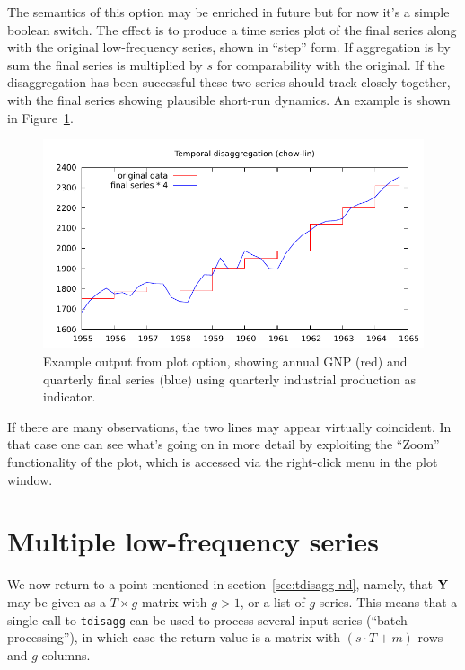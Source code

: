 The semantics of this option may be enriched in future but for now
it's a simple boolean switch. The effect is to produce a time series
plot of the final series along with the original low-frequency series,
shown in ``step'' form. If aggregation is by sum the final series is
multiplied by $s$ for comparability with the original. If the
disaggregation has been successful these two series should track
closely together, with the final series showing plausible short-run
dynamics. An example is shown in Figure~\ref{fig:gnpa}.

\begin{figure}
  \centering
  \includegraphics{figures/gnpa}
  \caption{Example output from plot option, showing annual GNP (red)
    and quarterly final series (blue) using quarterly industrial
    production as indicator.}
  \label{fig:gnpa}
\end{figure}

If there are many observations, the two lines may appear virtually
coincident. In that case one can see what's going on in more detail by
exploiting the ``Zoom'' functionality of the plot, which is accessed
via the right-click menu in the plot window.

\section{Multiple low-frequency series}
\label{sec:tdisagg-multi}

We now return to a point mentioned in section~\ref{sec:tdisagg-nd},
namely, that $\mathbf{Y}$ may be given as a $T \times g$ matrix with $g > 1$,
or a list of $g$ series. This means that a single call to
\texttt{tdisagg} can be used to process several input series (``batch
processing''), in which case the return value is a matrix with $(s
\cdot T + m)$ rows and $g$ columns.

